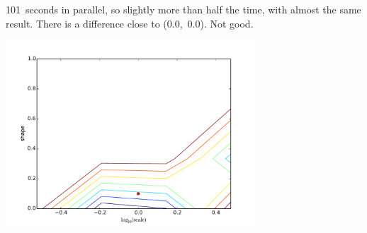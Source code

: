 \documentclass[11pt]{article}
\begin{document}
101~seconds in parallel, so slightly more than half the time, with almost the
same result. There is a difference close to (0.0,~0.0). Not good.
\begin{center}
	\includegraphics[width=0.7\textwidth]{parameterspace_parallel.pdf}
\end{center}
\end{document}
